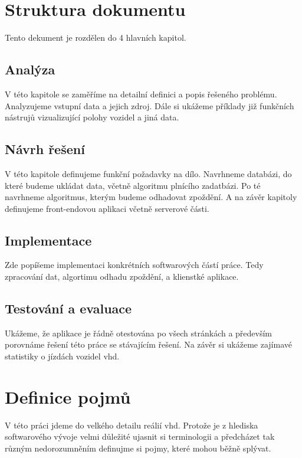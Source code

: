 \section*{Struktura dokumentu}

Tento dekument je rozdělen do 4 hlavních kapitol.

\subsection*{Analýza}

V této kapitole se zaměříme na detailní definici a popis řešeného problému. Analyzujeme vstupní data a jejich zdroj. Dále si ukážeme příklady již funkčních nástrujů vizualizující polohy vozidel a jiná data.

\subsection*{Návrh řešení}

V této kapitole definujeme funkční požadavky na dílo. Navrhneme databázi, do které budeme ukládat data, včetně algoritmu plnícího zadatbázi. Po té navrhneme algoritmus, kterým budeme odhadovat zpoždění. A na závěr kapitoly definujeme front-endovou aplikaci včetně serverové části.

\subsection*{Implementace}

Zde popíšeme implementaci konkrétních softwarových částí práce. Tedy zpracování dat, algortimu odhadu zpoždění, a klienstké aplikace.

\subsection*{Testování a evaluace}

Ukážeme, že aplikace je řádně otestována po všech stránkách a především porovnáme řešení této práce se stávajícím řešení. Na závěr si ukážeme zajímavé statistiky o jízdách vozidel \gls{vhd}.

\section*{Definice pojmů}

V této práci jdeme do velkého detailu reálií \gls{vhd}. Protože je z hlediska softwarového vývoje velmi důležité ujasnit si terminologii a předcházet tak různým nedorozumněním definujme si pojmy, které mohou běžně splývat.

